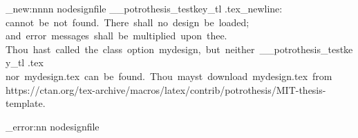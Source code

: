 
\ExplSyntaxOn

\msg_new:nnnn { \ClassName } { nodesignfile } 
	{ \g__potrothesis_testkey_tl .tex\iow_newline: cannot~be~not~found.~There~shall~no~design~be~loaded;~
	  and~error~messages~shall~be~multiplied~upon~thee.
	}{ 
	  Thou~hast~called~the~class~option~mydesign,~but~neither~\g__potrothesis_testkey_tl .tex\space
	  nor~mydesign.tex~can~be~found.~Thou~mayst~download~mydesign.tex~from\space
	  https://ctan.org/tex-archive/macros/latex/contrib/potrothesis/MIT-thesis-template. }
\ifmit@mydesign
		{ 
		   
		}
		{ \msg_error:nn { \ClassName } { nodesignfile } }
\else
	\AtBeginDocument{
		\hypersetup{
		linkcolor=Blue3,%
		citecolor=Blue3,
		urlcolor=violet,
		filecolor=red, 
		}
		\ifmit@lineno
			\renewcommand{\linenumberfont}{\sffamily\mdseries\tiny\color{violet}}%
		\fi
	}
\fi
\ExplSyntaxOff
